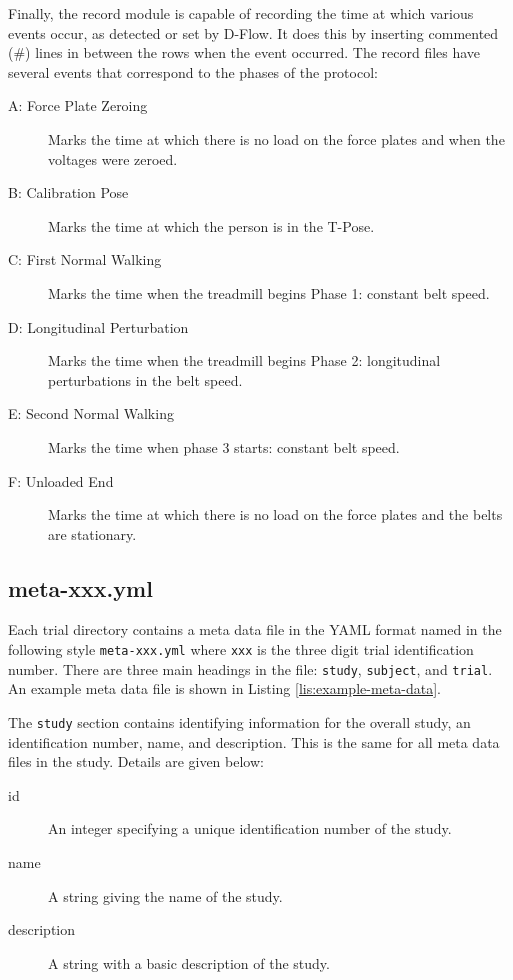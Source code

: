 \documentclass[fleqn,10pt]{wlpeerj}
\begin{document}
Finally, the record module is capable of recording the time at which various
events occur, as detected or set by D-Flow. It does this by inserting commented
(\#) lines in between the rows when the event occurred. The record files have
several events that correspond to the phases of the protocol:

\begin{description}
  \item[A: Force Plate Zeroing] Marks the time at which there is no load on the
    force plates and when the voltages were zeroed.
  \item[B: Calibration Pose] Marks the time at which the person is in the
    T-Pose.
  \item[C: First Normal Walking] Marks the time when the treadmill begins Phase
    1: constant belt speed.
  \item[D: Longitudinal Perturbation] Marks the time when the treadmill begins
    Phase 2: longitudinal perturbations in the belt speed.
  \item[E: Second Normal Walking] Marks the time when phase 3 starts: constant
    belt speed.
  \item[F: Unloaded End] Marks the time at which there is no load on the force
    plates and the belts are stationary.
\end{description}

\subsection*{meta-xxx.yml}

Each trial directory contains a meta data file in the YAML format named in the
following style \verb|meta-xxx.yml| where \verb|xxx| is the three digit trial
identification number. There are three main headings in the file: \verb+study+,
\verb+subject+, and \verb+trial+. An example meta data file is shown in Listing
\ref{lis:example-meta-data}.

The \verb+study+ section contains identifying information for the overall
study, an identification number, name, and description. This is the same for
all meta data files in the study. Details are given below:

\begin{description}
  \item[id] An integer specifying a unique identification number of the study.
  \item[name] A string giving the name of the study.
  \item[description] A string with a basic description of the study.
\end{description}
\end{document}
